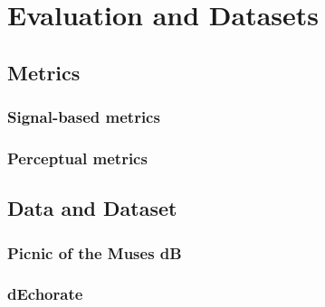 \chapter{Evaluation and Datasets}\label{chap:evaluation}

\section{Metrics}
\subsection{Signal-based metrics}
\subsection{Perceptual metrics}

\section{Data and Dataset}
\subsection{Picnic of the Muses dB}
\subsection{dEchorate}




